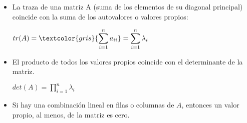 \begin{itemize}
\item La traza de una matriz A (suma de los elementos de su diagonal principal)	coincide con la suma de los autovalores o valores propios:

$\displaystyle tr(A)=\textcolor{gris}{\sum_{i=1}^n a_{ii}}=\sum_{i=1}^n \lambda_i$

\item El producto de todos los valores propios coincide con el determinante de la matriz.

$\displaystyle det(A)=\prod_{i=1}^n \lambda_i$

\item Si hay una combinación lineal en filas o columnas de $A$, entonces un valor propio, al menos, de la matriz es cero.
\end{itemize}

